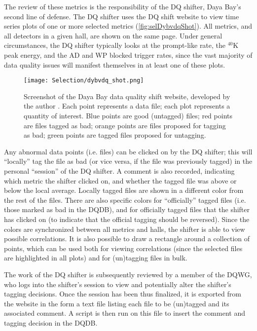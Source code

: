 \documentclass[../thesis.tex]{subfiles}
\begin{document}
The review of these metrics is the responsibility of the DQ shifter, Daya Bay's second line of defense. The DQ shifter uses the DQ shift website to view time series plots of one or more selected metrics (\autoref{fig:selDybvdqShot}). All metrics, and all detectors in a given hall, are shown on the same page. Under general circumstances, the DQ shifter typically looks at the prompt-like rate, the $^{40}$K peak energy, and the AD and WP blocked trigger rates, since the vast majority of data quality issues will manifest themselves in at least one of these plots.

\begin{figure}[h!]
  \texttt{[image: Selection/dybvdq\_shot.png]}
  \caption[Screenshot of Daya Bay data quality website.]{Screenshot of the Daya Bay data quality shift website, developed by the author \cite{dybvdq}. Each point represents a data file; each plot represents a quantity of interest. Blue points are good (untagged) files; red points are files tagged as bad; orange points are files proposed for tagging as bad; green points are tagged files proposed for untagging.}
  \label{fig:selDybvdqShot}
\end{figure}

Any abnormal data points (i.e. files) can be clicked on by the DQ shifter; this will ``locally'' tag the file as bad (or vice versa, if the file was previously tagged) in the personal ``session'' of the DQ shifter. A comment is also recorded, indicating which metric the shifter clicked on, and whether the tagged file was above or below the local average. Locally tagged files are shown in a different color from the rest of the files. There are also specific colors for ``officially'' tagged files (i.e. those marked as bad in the DQDB), and for officially tagged files that the shifter has clicked on (to indicate that the official tagging should be reversed). Since the colors are synchronized between all metrics and halls, the shifter is able to view possible correlations. It is also possible to draw a rectangle around a collection of points, which can be used both for viewing correlations (since the selected files are highlighted in all plots) and for (un)tagging files in bulk. 

The work of the DQ shifter is subsequently reviewed by a member of the DQWG, who logs into the shifter's session to view and potentially alter the shifter's tagging decisions. Once the session has been thus finalized, it is exported from the website in the form a text file listing each file to be (un)tagged and its associated comment. A script is then run on this file to insert the comment and tagging decision in the DQDB.
\end{document}
